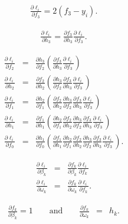 \documentclass[letterpaper,twoside,openany, titlepage,oldfontcommands,titles,dvipsnames]{memoir}
\begin{document}
\begin{eqnarray}
 \frac{\partial \ell_i}{\partial f_{3}} = 2(f_3-y_i).
 \end{eqnarray}

\begin{eqnarray}
 \frac{\partial \ell_i}{\partial h_{3}} =\frac{\partial f_{3}}{\partial h_{3}} \frac{\partial \ell_i}{\partial f_{3}} .
 \end{eqnarray}

\begin{eqnarray}
 \frac{\partial \ell_i}{\partial f_{2}} &=& \frac{\partial h_{3}}{\partial f_{2}}\left(
 \frac{\partial f_{3}}{\partial h_{3}}\frac{\partial \ell_i}{\partial f_{3}} \right)
 \nonumber \\
 \frac{\partial \ell_i}{\partial h_{2}} &=& \frac{\partial f_{2}}{\partial h_{2}}\left(\frac{\partial h_{3}}{\partial f_{2}}\frac{\partial f_{3}}{\partial h_{3}}\frac{\partial \ell_i}{\partial f_{3}}\right)\nonumber \\
 \frac{\partial \ell_i}{\partial f_{1}} &=& \frac{\partial h_{2}}{\partial f_{1}}\left( \frac{\partial f_{2}}{\partial h_{2}}\frac{\partial h_{3}}{\partial f_{2}}\frac{\partial f_{3}}{\partial h_{3}}\frac{\partial \ell_i}{\partial f_{3}} \right)\nonumber \\
 \frac{\partial \ell_i}{\partial h_{1}} &=& \frac{\partial f_{1}}{\partial h_{1}}\left(\frac{\partial h_{2}}{\partial f_{1}} \frac{\partial f_{2}}{\partial h_{2}}\frac{\partial h_{3}}{\partial f_{2}}\frac{\partial f_{3}}{\partial h_{3}}\frac{\partial \ell_i}{\partial f_{3}} \right)\nonumber \\
 \frac{\partial \ell_i}{\partial f_{0}} &=& \frac{\partial h_{1}}{\partial f_{0}}\left(\frac{\partial f_{1}}{\partial h_{1}}\frac{\partial h_{2}}{\partial f_{1}} \frac{\partial f_{2}}{\partial h_{2}}\frac{\partial h_{3}}{\partial f_{2}}\frac{\partial f_{3}}{\partial h_{3}}\frac{\partial \ell_i}{\partial f_{3}} \right).\label{eq:train2_simple_chain}
 \end{eqnarray}

\begin{eqnarray}
 \frac{\partial \ell_i}{\partial \beta_{k}} &=& \frac{\partial f_{k}}{\partial \beta_{k}}\frac{\partial \ell_i}{\partial f_{k}}\nonumber \\
 \frac{\partial \ell_i}{\partial \omega_{k}} &=& \frac{\partial f_{k}}{\partial \omega_{k}}\frac{\partial \ell_i}{\partial f_{k}}.
 \end{eqnarray}

\begin{eqnarray}
 \frac{\partial f_{k}}{\partial \beta_{k}} = 1 \quad\quad\mbox{and}\quad \quad \frac{\partial f_{k}}{\partial \omega_{k}} &=& h_{k}.
 \end{eqnarray}
\end{document}
